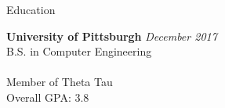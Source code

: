 \documentclass{resume} %
\begin{document}

\begin{rSection}{Education}

{\bf University of Pittsburgh} \hfill {\em December 2017} \\ 
B.S. in Computer Engineering \\
\smallskip \\
Member of Theta Tau \\
Overall GPA: 3.8

\end{rSection}

\end{document}
